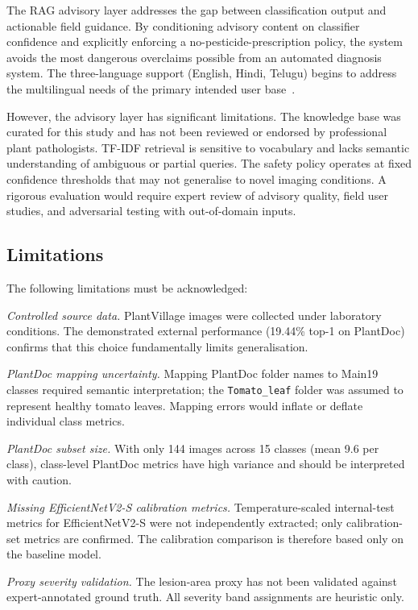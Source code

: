 \documentclass[conference]{IEEEtran}
\begin{document}
The RAG advisory layer addresses the gap between classification output and
actionable field guidance. By conditioning advisory content on classifier
confidence and explicitly enforcing a no-pesticide-prescription policy, the
system avoids the most dangerous overclaims possible from an automated diagnosis
system. The three-language support (English, Hindi, Telugu) begins to address
the multilingual needs of the primary intended user base~\cite{sujatha2021performance}.

However, the advisory layer has significant limitations. The knowledge base
was curated for this study and has not been reviewed or endorsed by professional
plant pathologists. TF-IDF retrieval is sensitive to vocabulary and lacks
semantic understanding of ambiguous or partial queries. The safety policy
operates at fixed confidence thresholds that may not generalise to novel
imaging conditions. A rigorous evaluation would require expert review of advisory
quality, field user studies, and adversarial testing with out-of-domain inputs.

\subsection{Limitations}

The following limitations must be acknowledged:

\textit{Controlled source data.} PlantVillage images were collected under
laboratory conditions. The demonstrated external performance (19.44\% top-1 on
PlantDoc) confirms that this choice fundamentally limits generalisation.

\textit{PlantDoc mapping uncertainty.} Mapping PlantDoc folder names to Main19
classes required semantic interpretation; the \texttt{Tomato\_leaf} folder was
assumed to represent healthy tomato leaves. Mapping errors would inflate or
deflate individual class metrics.

\textit{PlantDoc subset size.} With only 144 images across 15 classes (mean
9.6 per class), class-level PlantDoc metrics have high variance and should be
interpreted with caution.

\textit{Missing EfficientNetV2-S calibration metrics.} Temperature-scaled
internal-test metrics for EfficientNetV2-S were not independently extracted;
only calibration-set metrics are confirmed. The calibration comparison is
therefore based only on the baseline model.

\textit{Proxy severity validation.} The lesion-area proxy has not been validated
against expert-annotated ground truth. All severity band assignments are
heuristic only.
\end{document}
